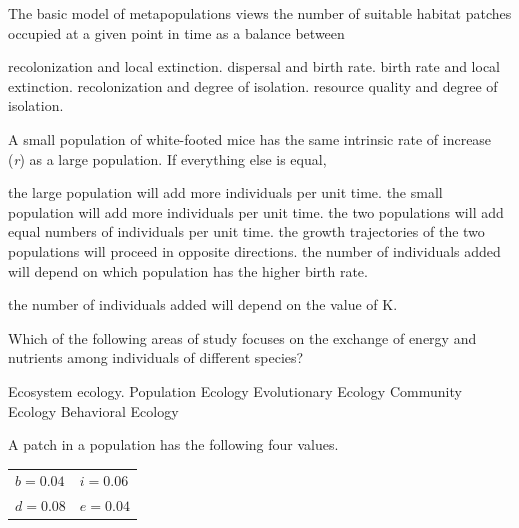 \question
The basic model of metapopulations views the number of suitable habitat patches occupied at a given point in time as a balance between

\begin{choices}
\correctchoice recolonization and local extinction. %
\choice dispersal and birth rate. %
\choice birth rate and local extinction. %
\choice recolonization and degree of isolation. %
\choice resource quality and degree of isolation. %
\end{choices}



\question
A small population of white-footed mice has the same intrinsic rate of increase (\textit{r}) as a large population.  If everything else is equal, 

\begin{choices}
\correctchoice the large population will add more individuals per unit time.  %
\choice the small population will add more individuals per unit time. %
\choice the two populations will add equal numbers of individuals per unit time.%
\choice the growth trajectories of the two populations will proceed in opposite directions. %
\choice the number of individuals added will depend on which population has the higher birth rate. %
\end{choices}

\choice the number of individuals added will depend on the value of K. %


\question
Which of the following areas of study focuses on the exchange of energy and nutrients among individuals of different species?

\begin{choices}
\correctchoice Ecosystem ecology. %
\choice Population Ecology %
\choice Evolutionary Ecology %
\choice Community Ecology %
\choice Behavioral Ecology %
\end{choices}


\question
A patch in a population has the following four values. 

\qquad\begin{tabular}{@{}ll@{}}
$b = 0.04$ & $i = 0.06$\\
$d = 0.08$ & $e = 0.04$\\
\end{tabular}

